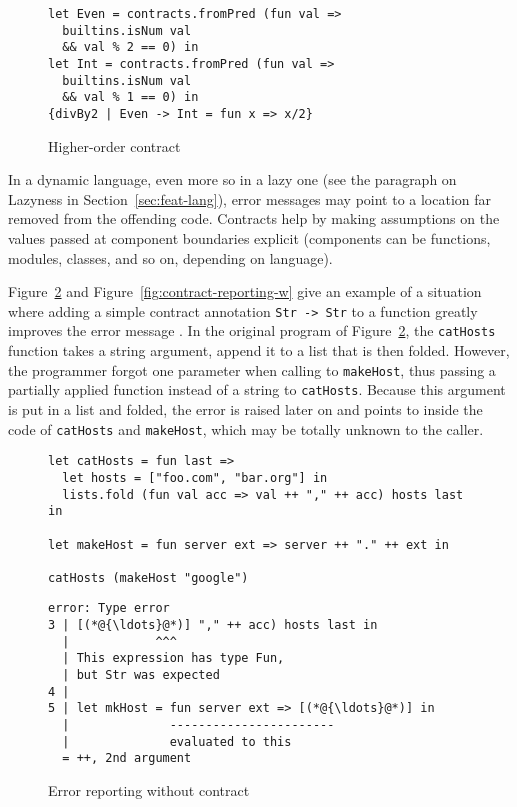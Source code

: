 \documentclass[sigplan,10pt,review,anonymous]{acmart}
\newcommand{\nickel}[1]{\lstinline[language=nickel]{#1}}
\begin{document}
\begin{figure}[h]
  \begin{center}
\begin{lstlisting}[language=Nickel]
let Even = contracts.fromPred (fun val =>
  builtins.isNum val
  && val % 2 == 0) in
let Int = contracts.fromPred (fun val =>
  builtins.isNum val
  && val % 1 == 0) in
{divBy2 | Even -> Int = fun x => x/2}
\end{lstlisting}
  \end{center}
\caption{Higher-order contract}
\label{fig:contract-higher-order}
\end{figure}

In a dynamic language, even more so in a lazy one (see the paragraph on Lazyness
in Section~\ref{sec:feat-lang}), error messages may point to a location far
removed from the offending code. Contracts help by making assumptions on the
values passed at component boundaries explicit (components can be functions,
modules, classes, and so on, depending on language).

Figure~\ref{fig:contract-reporting-wo} and Figure~\ref{fig:contract-reporting-w}
give an example of a situation where adding a simple contract annotation
\nickel{Str -> Str} to a function greatly improves the error message . In the
original program of Figure~\ref{fig:contract-reporting-wo}, the
\nickel{catHosts} function takes a string argument, append it to a list that is
then folded. However, the programmer forgot one parameter when calling to
\nickel{makeHost}, thus passing a partially applied function instead of a string
to \nickel{catHosts}. Because this argument is put in a list and folded, the
error is raised later on and points to inside the code of \nickel{catHosts} and
\nickel{makeHost}, which may be totally unknown to the caller.

\begin{figure}[h]
  \begin{center}
\begin{lstlisting}[language=nickel,title={Source program}]
let catHosts = fun last =>
  let hosts = ["foo.com", "bar.org"] in
  lists.fold (fun val acc => val ++ "," ++ acc) hosts last in

let makeHost = fun server ext => server ++ "." ++ ext in

catHosts (makeHost "google")
\end{lstlisting}

\begin{lstlisting}[title={Error message},frame=none,numbers=none]
error: Type error
3 | [(*@{\ldots}@*)] "," ++ acc) hosts last in
  |            ^^^
  | This expression has type Fun,
  | but Str was expected
4 |
5 | let mkHost = fun server ext => [(*@{\ldots}@*)] in
  |              -----------------------
  |              evaluated to this
  = ++, 2nd argument
\end{lstlisting}
  \end{center}
\caption{Error reporting without contract}
\label{fig:contract-reporting-wo}
\end{figure}
\end{document}
